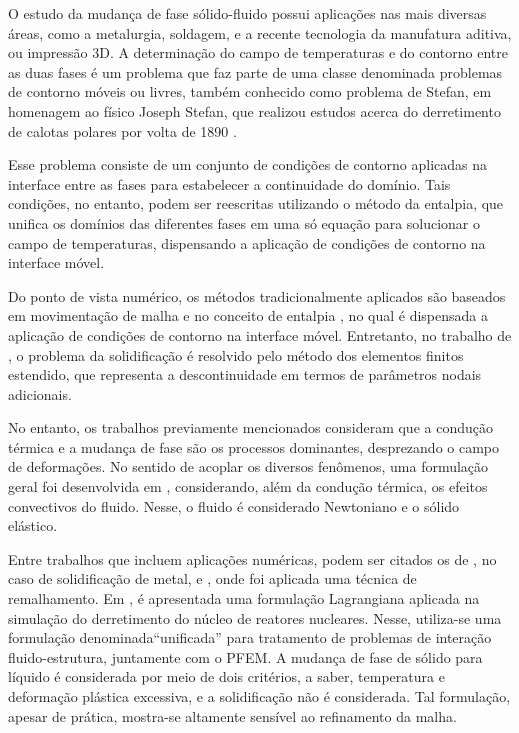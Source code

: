 \documentclass[Tese.tex]{subfiles}
\begin{document}
O estudo da mudança de fase sólido-fluido possui aplicações nas mais diversas áreas, como a metalurgia, soldagem, e a recente tecnologia da manufatura aditiva, ou impressão 3D. A determinação do campo de temperaturas e do contorno entre as duas fases é um problema que faz parte de uma classe denominada problemas de contorno móveis ou livres, também conhecido como problema de Stefan, em homenagem ao físico Joseph Stefan, que realizou estudos acerca do derretimento de calotas polares por volta de 1890 \cite{crank1987free}. 

Esse problema consiste de um conjunto de condições de contorno aplicadas na interface entre as fases para estabelecer a continuidade do domínio. Tais condições, no entanto, podem ser reescritas utilizando o método da entalpia, que unifica os domínios das diferentes fases em uma só equação para solucionar o campo de temperaturas, dispensando a aplicação de condições de contorno na interface móvel. 

Do ponto de vista numérico, os métodos tradicionalmente aplicados são baseados em movimentação de malha \cite{Albert1986} e no conceito de entalpia \cite{RolphBathe1982}, no qual é dispensada a aplicação de condições de contorno na interface móvel. Entretanto, no trabalho de , o problema da solidificação é resolvido pelo método dos elementos finitos estendido, que representa a descontinuidade em termos de parâmetros nodais adicionais.

No entanto, os trabalhos previamente mencionados consideram que a condução térmica e a mudança de fase são os processos dominantes, desprezando o campo de deformações. No sentido de acoplar os diversos fenômenos, uma formulação geral foi desenvolvida em , considerando, além da condução térmica, os efeitos convectivos do fluido. Nesse, o fluido é considerado Newtoniano e o sólido elástico. 

Entre trabalhos que incluem aplicações numéricas, podem ser citados os de , no caso de solidificação de metal, e , onde foi aplicada uma técnica de remalhamento. Em , é apresentada uma formulação Lagrangiana aplicada na simulação do derretimento do núcleo de reatores nucleares. Nesse, utiliza-se uma formulação denominada``unificada'' para tratamento de problemas de interação fluido-estrutura, juntamente com o PFEM. A mudança de fase de sólido para líquido é considerada por meio de dois critérios, a saber, temperatura e deformação plástica excessiva, e a solidificação não é considerada. Tal formulação, apesar de prática, mostra-se altamente sensível ao refinamento da malha. 
\end{document}
